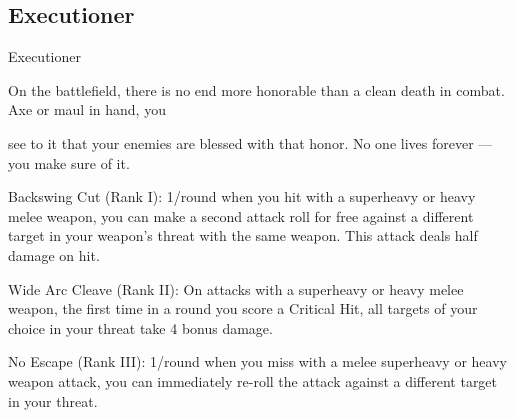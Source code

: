 \subsection{Executioner}

                                                Executioner  

On the battlefield, there is no end more honorable than a clean death in combat. Axe or maul in hand, you  

see to it that your enemies are blessed with that honor. No one lives forever — you make sure of it.   

Backswing Cut (Rank I): 1/round when you hit with a superheavy or heavy melee weapon, you  
can make a second attack roll for free against a different target in your weapon’s threat with the  
same weapon. This attack deals half damage on hit.
 
Wide Arc Cleave (Rank II): On attacks with a superheavy or heavy melee weapon, the first time  
in a round you score a Critical Hit, all targets of your choice in your threat take 4 bonus damage.
 
No Escape (Rank III): 1/round when you miss with a melee superheavy or heavy weapon attack,  
you can immediately re-roll the attack against a different target in your threat.